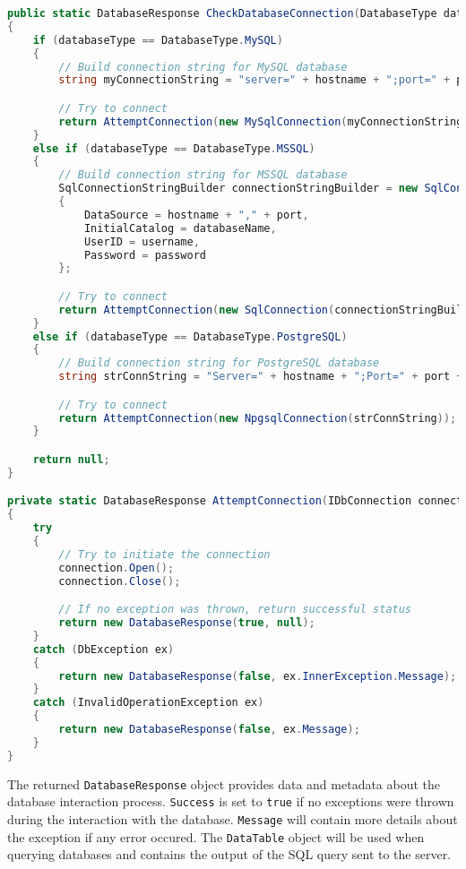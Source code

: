 \begin{lstlisting}[language=csharp, caption={The CheckDatabaseConnection() method that tries to initiate a connection with a database through its parameters}]
public static DatabaseResponse CheckDatabaseConnection(DatabaseType databaseType, string hostname, int port, string databaseName,  string username, string password)
{
    if (databaseType == DatabaseType.MySQL)
    {
        // Build connection string for MySQL database
        string myConnectionString = "server=" + hostname + ";port=" + port + ";database=" + databaseName + ";uid=" + username + ";pwd=" + password + ";";

        // Try to connect
        return AttemptConnection(new MySqlConnection(myConnectionString));
    }
    else if (databaseType == DatabaseType.MSSQL)
    {
        // Build connection string for MSSQL database
        SqlConnectionStringBuilder connectionStringBuilder = new SqlConnectionStringBuilder()
        {
            DataSource = hostname + "," + port,
            InitialCatalog = databaseName,
            UserID = username,
            Password = password
        };

        // Try to connect
        return AttemptConnection(new SqlConnection(connectionStringBuilder.ConnectionString));
    }
    else if (databaseType == DatabaseType.PostgreSQL)
    {
        // Build connection string for PostgreSQL database
        string strConnString = "Server=" + hostname + ";Port=" + port + ";User Id=" + username + ";Password=" + password + ";Database=" + databaseName;

        // Try to connect
        return AttemptConnection(new NpgsqlConnection(strConnString));
    }

    return null;
}

private static DatabaseResponse AttemptConnection(IDbConnection connection)
{
    try
    {
        // Try to initiate the connection
        connection.Open();
        connection.Close();

        // If no exception was thrown, return successful status
        return new DatabaseResponse(true, null);
    }
    catch (DbException ex)
    {
        return new DatabaseResponse(false, ex.InnerException.Message);
    }
    catch (InvalidOperationException ex)
    {
        return new DatabaseResponse(false, ex.Message);
    }
}
\end{lstlisting}

The returned \texttt{DatabaseResponse} object provides data and metadata about the database interaction process. \texttt{Success} is set to \texttt{true} if no exceptions were thrown during the interaction with the database. \texttt{Message} will contain more details about the exception if any error occured. The \texttt{DataTable} object will be used when querying databases and contains the output of the SQL query sent to the server.

